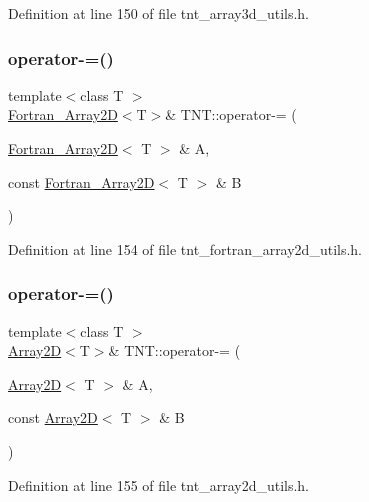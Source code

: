 Definition at line 150 of file tnt\+\_\+array3d\+\_\+utils.\+h.

\mbox{\label{namespaceTNT_af6150ea38afd7644250d5cf739462af0}} 
\subsubsection{\texorpdfstring{operator-\/=()}{operator-=()}\hspace{0.1cm}{\footnotesize\ttfamily [3/5]}}
{\footnotesize\ttfamily template$<$class T $>$ \\
\hyperlink{classTNT_1_1Fortran__Array2D}{Fortran\+\_\+\+Array2D}$<$T$>$\& T\+N\+T\+::operator-\/= (\begin{DoxyParamCaption}\item[{\hyperlink{classTNT_1_1Fortran__Array2D}{Fortran\+\_\+\+Array2D}$<$ T $>$ \&}]{A,  }\item[{const \hyperlink{classTNT_1_1Fortran__Array2D}{Fortran\+\_\+\+Array2D}$<$ T $>$ \&}]{B }\end{DoxyParamCaption})}



Definition at line 154 of file tnt\+\_\+fortran\+\_\+array2d\+\_\+utils.\+h.

\mbox{\label{namespaceTNT_a5f46b48fb7c2c25d9c78c888dfbfbb59}} 
\subsubsection{\texorpdfstring{operator-\/=()}{operator-=()}\hspace{0.1cm}{\footnotesize\ttfamily [4/5]}}
{\footnotesize\ttfamily template$<$class T $>$ \\
\hyperlink{classTNT_1_1Array2D}{Array2D}$<$T$>$\& T\+N\+T\+::operator-\/= (\begin{DoxyParamCaption}\item[{\hyperlink{classTNT_1_1Array2D}{Array2D}$<$ T $>$ \&}]{A,  }\item[{const \hyperlink{classTNT_1_1Array2D}{Array2D}$<$ T $>$ \&}]{B }\end{DoxyParamCaption})}



Definition at line 155 of file tnt\+\_\+array2d\+\_\+utils.\+h.

